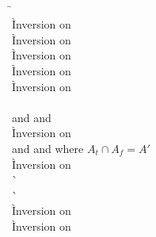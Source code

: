 \begin{description}
\item[] \ \\
  \newcommand{\ifstack}{\frameexp{F}{\ifexp{\cdot}{e_t}{e_f}}}
  \begin{tabbing}
  \hspace{3em} \= \hspace{3em} \= \\
    \` Inversion on  \\
    \` Inversion on  \\
    \` Inversion on  \\
    \` Inversion on  \\
    \` Inversion on  \\
  \\
   and  and  \\
    \` Inversion on  \\
   and  and  where $A_t \cap A_f = A'$ \\
    \` Inversion on  \\
    \`  \\
    \`  \\
    \` Inversion on  \\
    \` Inversion on  \\

\end{tabbing}
\end{description}
